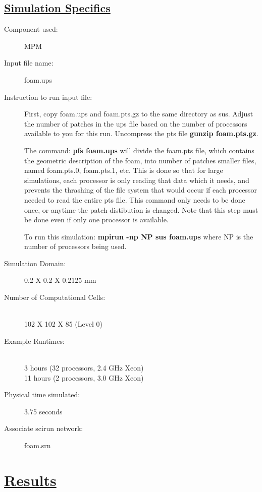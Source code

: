 \documentclass[fleqn]{article}
\begin{document}
\subsection*{\underline{Simulation Specifics}}
\begin{description} 
\item [Component used:] \hfill MPM
\item [Input file name:] \hfill foam.ups
\item [Instruction to run input file:]

First, copy foam.ups and foam.pts.gz to the same directory as sus.
Adjust the number of patches in the ups file based on
the number of processors available to you for this run.
Uncompress the pts file {\bf gunzip foam.pts.gz}.

The command:  {\bf pfs foam.ups} will divide the foam.pts
file, which contains the geometric description of the foam,
into number of patches smaller files, named foam.pts.0,
foam.pts.1, etc.  This is done so that for large simulations,
each processor is only reading that data which it needs, and
prevents the thrashing of the file system that would occur
if each processor needed to read the entire pts file.  This
command only needs to be done once, or anytime the patch
distibution is changed.  Note that this step must be done even
if only one processor is available.

To run this simulation:  {\bf mpirun -np NP sus foam.ups}
where NP is the number of processors being used.

\item [Simulation Domain:]\hfill  0.2 X 0.2 X 0.2125 mm

\item [Number of Computational Cells:]\hfill \\ 
102 X 102 X 85 (Level 0)

\item [Example Runtimes:] \hfill \\
 3 hours  (32 processors, 2.4 GHz Xeon)\\
 11 hours (2 processors,  3.0 GHz Xeon)\\

\item [Physical time simulated:] \hfill 3.75 seconds

\item [Associate scirun network:] \hfill foam.srn

\end{description}

\section*{\underline{Results}}
\end{document}
